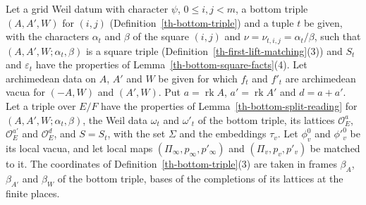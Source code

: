 \begin{situation}\label{th-bottom-split-situation}
Let a grid Weil datum with character $\psi$, $0\leq i,j<m$, a bottom triple
$(A,A',W)$ for $(i,j)$ (Definition~\ref{th-bottom-triple}) and a tuple $t$ be
given, with the characters $\alpha_t$ and $\beta$ of the square $(i,j)$ and
$\nu=\nu_{t,i,j}=\alpha_t/\beta$, such that $(A,A',W;\alpha_t,\beta)$ is a
square triple (Definition~\ref{th-first-lift-matching}(3)) and $S_t$ and
$\varepsilon_t$ have the properties of Lemma~\ref{th-bottom-square-facts}(4).
Let archimedean data on $A$, $A'$ and $W$ be given for which $f_t$ and $f'_t$
are archimedean vacua for $(-A,W)$ and $(A',W)$. Put $a=\operatorname{rk}A$,
$a'=\operatorname{rk}A'$ and $d=a+a'$. Let a triple over $E/F$ have the
properties of Lemma~\ref{th-bottom-split-reading} for $(A,A',W;\alpha_t,\beta)$,
the Weil data $\omega_t$ and $\omega'_t$ of the bottom triple, its lattices
$\mathcal O_E^a$, $\mathcal O_E^{a'}$ and $\mathcal O_E^d$, and $S=S_t$, with
the set $\Sigma$ and the embeddings $\tau_v$. Let $\phi^0_v$ and $\phi'^0_v$ be
its local vacua, and let local maps $(\Pi_\infty,p_\infty,p'_\infty)$ and
$(\Pi_v,p_v,p'_v)$ be matched to it. The coordinates of
Definition~\ref{th-bottom-triple}(3) are taken in frames $\beta_A$,
$\beta_{A'}$ and $\beta_W$ of the bottom triple, bases of the completions of
its lattices at the finite places.


\end{situation}
